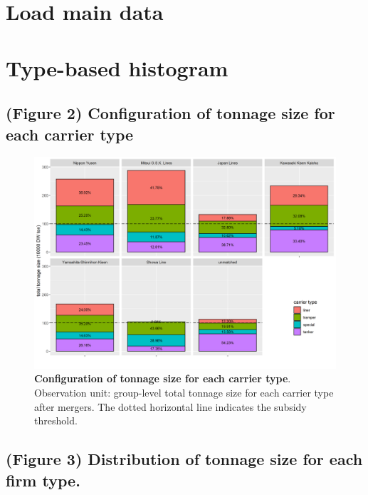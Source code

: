 \documentclass[
  10pt,
]{article}
\begin{document}
\hypertarget{load-main-data}{%
\section{Load main data}\label{load-main-data}}

\hypertarget{type-based-histogram}{%
\section{Type-based histogram}\label{type-based-histogram}}

\hypertarget{figure-2-configuration-of-tonnage-size-for-each-carrier-type}{%
\subsection{(Figure 2) Configuration of tonnage size for each carrier
type}\label{figure-2-configuration-of-tonnage-size-for-each-carrier-type}}

\begin{figure}[!ht]
\begin{center}
\includegraphics[height = 0.37\textheight]{../figuretable/carrier_composition_eachgroup.png}
\end{center}
\caption{\textbf{Configuration of tonnage size for each carrier type}. Observation unit: group-level total tonnage size for each carrier type after mergers. The dotted horizontal line indicates the subsidy threshold.}
\label{fg:carrier_composition_eachgroup}
\end{figure}

\hypertarget{figure-3-distribution-of-tonnage-size-for-each-firm-type.}{%
\subsection{(Figure 3) Distribution of tonnage size for each firm
type.}\label{figure-3-distribution-of-tonnage-size-for-each-firm-type.}}
\end{document}
